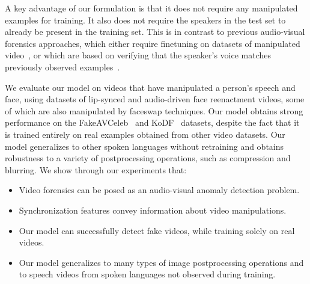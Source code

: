 \documentclass[10pt,twocolumn,letterpaper]{article}
\begin{document}
A key advantage of our formulation is that it does not require any manipulated examples for training. It also does not require the speakers in the test set to already be present in the training set. This is in contrast to previous audio-visual forensics approaches, which either require finetuning on datasets of manipulated video~\cite{haliassos2022leveraging}, or which are based on verifying that the speaker's voice matches previously observed examples~\cite{cozzolino2022audio}.

We evaluate our model on videos that have manipulated a person's speech and face, using datasets of lip-synced and audio-driven face reenactment videos, some of which are also manipulated by faceswap techniques. Our model obtains strong performance on the FakeAVCeleb~\cite{NEURIPS_DATASETS_AND_BENCHMARKS2021_d9d4f495} and KoDF~\cite{kwon2021kodf} datasets, despite the fact that it is trained entirely on real examples obtained from other video datasets. Our model generalizes to other spoken languages without retraining and obtains robustness to a variety of postprocessing operations, such as compression and blurring. We show through our experiments that: \begin{itemize}[leftmargin=*,topsep=1pt, noitemsep]
   \item Video forensics can be posed as an audio-visual anomaly detection problem.
   \item Synchronization features convey information about video manipulations.
   \item Our model can successfully detect fake videos, while training solely on real videos.
   \item Our model generalizes to many types of image postprocessing operations and to speech videos from spoken languages not observed during training.
\end{itemize}
\end{document}
